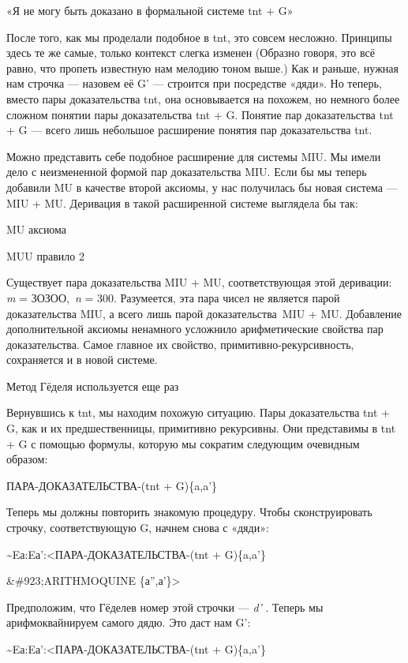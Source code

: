 \documentclass[../main.tex]{subfiles}
\begin{document}
«Я не могу быть доказано в формальной системе \acs{tnt} + G»

После того, как мы проделали подобное в \acs{tnt}, это совсем несложно. Принципы здесь те же самые, только контекст слегка изменен (Образно говоря, это всё равно, что пропеть известную нам мелодию тоном выше.) Как и раньше, нужная нам строчка --- назовем её G' --- строится при посредстве «дяди». Но теперь, вместо пары доказательства \acs{tnt}, она основывается на похожем, но немного более сложном понятии пары доказательства \acs{tnt} + G. Понятие пар доказательства \acs{tnt} + G --- всего лишь небольшое расширение понятия пар доказательства \acs{tnt}.

Можно представить себе подобное расширение для системы MIU\@. Мы имели дело с неизмененной формой пар доказательства MIU\@. Если бы мы теперь добавили MU в качестве второй аксиомы, у нас получилась бы новая система --- MIU + MU\@. Деривация в такой расширенной системе выглядела бы так:

MU аксиома

MUU правило 2

Существует пара доказательства MIU + MU, соответствующая этой деривации: \emph{m} = ЗОЗОО,~\emph{n} = 300. Разумеется, эта пара чисел не является парой доказательства MIU, а всего лишь парой доказательства~MIU + MU\@. Добавление дополнительной аксиомы ненамного усложнило арифметические свойства пар доказательства. Самое главное их свойство, примитивно-рекурсивность, сохраняется и в новой системе.

Метод Гёделя используется еще раз

Вернувшись к \acs{tnt}, мы находим похожую ситуацию. Пары доказательства \acs{tnt} + G, как и их предшественницы, примитивно рекурсивны. Они представимы в \acs{tnt} + G с помощью формулы, которую мы сократим следующим очевидным образом:

ПАРА-ДОКАЗАТЕЛЬСТВА-(\acs{tnt} + G)\{a,a'\}

Теперь мы должны повторить знакомую процедуру. Чтобы сконструировать строчку, соответствующую G, начнем снова с «дяди»:

\textasciitilde Eа:Eа':\textless ПАРА-ДОКАЗАТЕЛЬСТВА-(\acs{tnt} + G)\{a,a'\}

\&\#923;ARITHMOQUINE \{а'',а'\}\textgreater{}

Предположим, что Гёделев номер этой строчки --- \emph{d'} . Теперь мы арифмоквайнируем самого дядю. Это даст нам G':

\textasciitilde Eа:Eа':\textless ПАРА-ДОКАЗАТЕЛЬСТВА-(\acs{tnt} + G)\{a,a'\}
\end{document}
